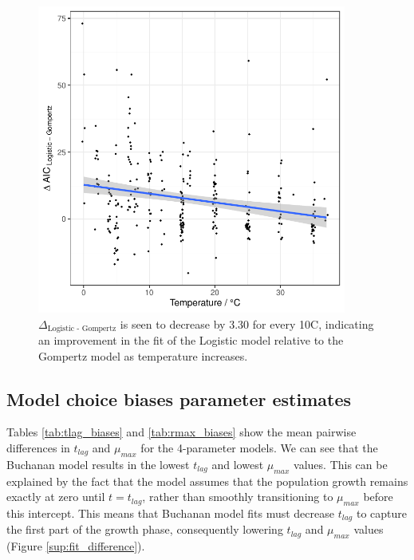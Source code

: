 \documentclass[11pt, a4paper]{article}
\begin{document}
\begin{linenumbers}
                \begin{figure}[H]
                \centering
        \includegraphics[width=4in]{../results/logistic_vs_gompertz_temp.pdf}
        \caption{$\Delta_{\text{Logistic - Gompertz}}$ is seen to decrease by 3.30 for every 10\degree C, indicating an improvement in the fit of the Logistic model relative to the Gompertz model as temperature increases.}
        \label{fig:logistic_temp}
        \end{figure}  

\subsection{Model choice biases parameter estimates}

Tables \ref{tab:tlag_biases} and \ref{tab:rmax_biases} show the mean pairwise differences in $t_{lag}$ and $\mu_{max}$ for the 4-parameter models. We can see that the Buchanan model results in the lowest $t_{lag}$ and lowest $\mu_{max}$ values. This can be explained by the fact that the model assumes that the population growth remains exactly at zero until $t = t_{lag}$, rather than smoothly transitioning to $\mu_{max}$ before this intercept. This means that Buchanan model fits must decrease $t_{lag}$ to capture the first part of the growth phase, consequently lowering $t_{lag}$ and $\mu_{max}$ values (Figure \ref{sup:fit_difference}).


\end{linenumbers}
\end{document}
